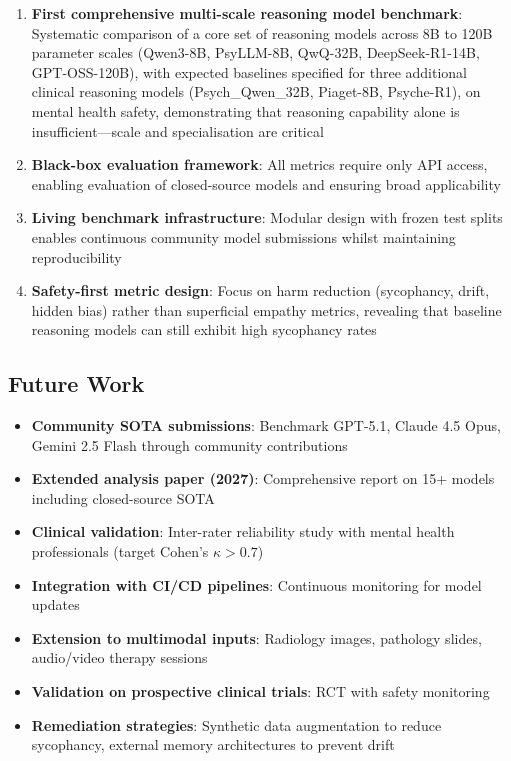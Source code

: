 \documentclass[11pt,a4paper]{article}
\begin{document}
\begin{enumerate}
\item \textbf{First comprehensive multi-scale reasoning model benchmark}: Systematic comparison of a core set of reasoning models across 8B to 120B parameter scales (Qwen3-8B, PsyLLM-8B, QwQ-32B, DeepSeek-R1-14B, GPT-OSS-120B), with expected baselines specified for three additional clinical reasoning models (Psych\_Qwen\_32B, Piaget-8B, Psyche-R1), on mental health safety, demonstrating that reasoning capability alone is insufficient---scale and specialisation are critical
    
    \item \textbf{Black-box evaluation framework}: All metrics require only API access, enabling evaluation of closed-source models and ensuring broad applicability
    
    \item \textbf{Living benchmark infrastructure}: Modular design with frozen test splits enables continuous community model submissions whilst maintaining reproducibility
    
    \item \textbf{Safety-first metric design}: Focus on harm reduction (sycophancy, drift, hidden bias) rather than superficial empathy metrics, revealing that baseline reasoning models can still exhibit high sycophancy rates
\end{enumerate}

\subsection{Future Work}

\begin{itemize}
    \item \textbf{Community SOTA submissions}: Benchmark GPT-5.1, Claude 4.5 Opus, Gemini 2.5 Flash through community contributions
    \item \textbf{Extended analysis paper (2027)}: Comprehensive report on 15+ models including closed-source SOTA
    \item \textbf{Clinical validation}: Inter-rater reliability study with mental health professionals (target Cohen's $\kappa > 0.7$)
    \item \textbf{Integration with CI/CD pipelines}: Continuous monitoring for model updates
    \item \textbf{Extension to multimodal inputs}: Radiology images, pathology slides, audio/video therapy sessions
    \item \textbf{Validation on prospective clinical trials}: RCT with safety monitoring
    \item \textbf{Remediation strategies}: Synthetic data augmentation to reduce sycophancy, external memory architectures to prevent drift
\end{itemize}
\end{document}
